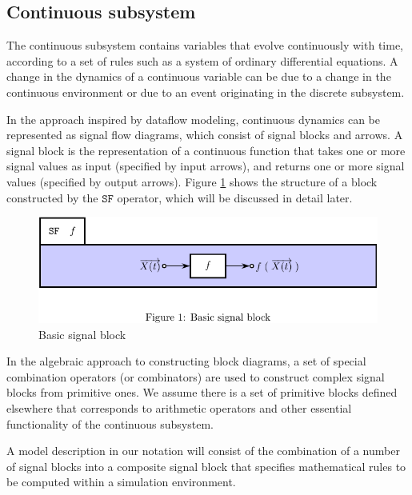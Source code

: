 \documentclass[a4paper]{article}
\begin{document}
\subsection{Continuous subsystem}

The continuous subsystem contains variables that evolve
continuously with time, according to a set of rules such as a system
of ordinary differential equations. A change in the dynamics of a
continuous variable can be due to a change in the continuous
environment or due to an event originating in the discrete
subsystem. 

In the approach inspired by dataflow modeling, continuous dynamics
can be represented as signal flow diagrams, which consist of signal
blocks and arrows. A signal block is the representation of a
continuous function that takes one or more signal values as
input (specified by input arrows), and returns one or more signal
values (specified by output arrows).
Figure \ref{Fig:SignalBlock} shows the structure of a block
constructed by the $\texttt{SF}$ operator, which will be discussed
in detail later. 

\begin{figure}
\includegraphics{figures/BasicSignalBlock}
\caption{\label{Fig:SignalBlock}Basic signal block}
\end{figure}

In the algebraic approach to constructing block diagrams, a set of
special combination operators (or combinators) are used to construct
complex signal blocks from primitive ones. We assume there is a set of
primitive blocks defined elsewhere that corresponds to arithmetic
operators and other essential functionality of the continuous
subsystem. 

A model description in our notation will consist of the
combination of a number of signal blocks into a composite signal block
that specifies mathematical rules to be computed within a simulation
environment. 
\end{document}
